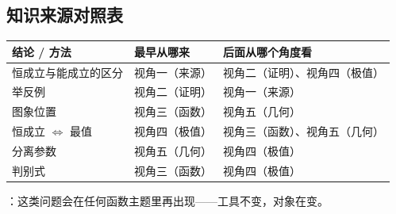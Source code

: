 \begin{afterclass}
\subsection{知识来源对照表}
\begin{center}
\footnotesize
\setlength{\tabcolsep}{4pt}
\renewcommand{\arraystretch}{1.35}
\begin{tabular}{p{3.6cm}p{3.8cm}p{5.6cm}}
\toprule
结论 / 方法 & 最早从哪来 & 后面从哪个角度看 \\
\midrule
恒成立与能成立的区分 & 视角一（来源） & 视角二（证明）、视角四（极值） \\
举反例 & 视角二（证明） & 视角一（来源） \\
图象位置 & 视角三（函数） & 视角五（几何） \\
恒成立 $\iff$ 最值 & 视角四（极值） & 视角三（函数）、视角五（几何） \\
分离参数 & 视角五（几何） & 视角四（极值） \\
判别式 & 视角三（函数） & 视角四（极值） \\
\bottomrule
\end{tabular}
\end{center}

：这类问题会在任何函数主题里再出现——工具不变，对象在变。
\end{afterclass}
